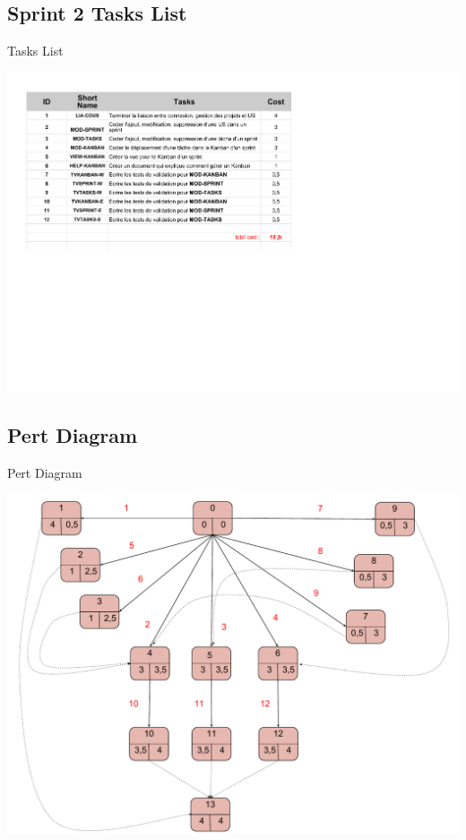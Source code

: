\documentclass{beamer}
\begin{document}
\subsection{Sprint 2 Tasks List}

\begin{frame}{Tasks List}
	\begin{center}
        \includegraphics[scale=0.52]{Sprint3TasksList.pdf}
        \end{center}
\end{frame}

\subsection{Pert Diagram}

\begin{frame}{Pert Diagram}
	\begin{center}
       \includegraphics[scale=0.32]{Pert3.pdf}
        \end{center}
\end{frame}
\end{document}
